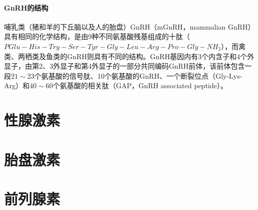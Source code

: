 \paragraph{GnRH的结构}

哺乳类（猪和羊的下丘脑以及人的胎盘）GnRH（mGnRH，mammalian GnRH）具有相同的化学结构，是由9种不同氨基酸残基组成的十肽（$ PGlu -His-Try-Ser-Tyr-Gly-Leu-Arg-Pro-Gly-NH_2 $），而禽类、两栖类及鱼类的GnRH则具有不同的结构。GnRH基因内有3个内含子和4个外显子，由第2、3外显子和第4外显子的一部分共同编码GnRH前体，该前体包含一段$ 21 \sim 23 $个氨基酸的信号肽、10个氨基酸的GnRH、一个断裂位点（Gly-Lys-Arg）和$ 40 \sim 60 $个氨基酸的相关肽（GAP，GnRH associated peptide）。



\section{性腺激素}

\section{胎盘激素}

\section{前列腺素}